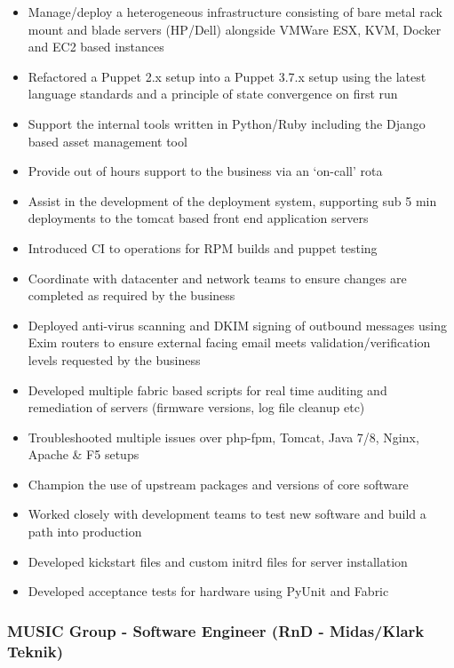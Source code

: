 \begin{itemize}
\itemsep1pt\parskip0pt
\item
  Manage/deploy a heterogeneous infrastructure consisting of bare metal
  rack mount and blade servers (HP/Dell) alongside VMWare ESX, KVM,
  Docker and EC2 based instances
\item
  Refactored a Puppet 2.x setup into a Puppet 3.7.x setup using the
  latest language standards and a principle of state convergence on
  first run
\item
  Support the internal tools written in Python/Ruby including the Django
  based asset management tool
\item
  Provide out of hours support to the business via an `on-call' rota
\item
  Assist in the development of the deployment system, supporting sub 5
  min deployments to the tomcat based front end application servers
\item
  Introduced CI to operations for RPM builds and puppet testing
\item
  Coordinate with datacenter and network teams to ensure changes are
  completed as required by the business
\item
  Deployed anti-virus scanning and DKIM signing of outbound messages
  using Exim routers to ensure external facing email meets
  validation/verification levels requested by the business
\item
  Developed multiple fabric based scripts for real time auditing and
  remediation of servers (firmware versions, log file cleanup etc)
\item
  Troubleshooted multiple issues over php-fpm, Tomcat, Java 7/8, Nginx,
  Apache \& F5 setups
\item
  Champion the use of upstream packages and versions of core software
\item
  Worked closely with development teams to test new software and build a
  path into production
\item
  Developed kickstart files and custom initrd files for server
  installation
\item
  Developed acceptance tests for hardware using PyUnit and Fabric
\end{itemize}

\subsubsection{MUSIC Group - Software Engineer (RnD - Midas/Klark
Teknik)}\label{music-group---software-engineer-rnd---midasklark-teknik}

